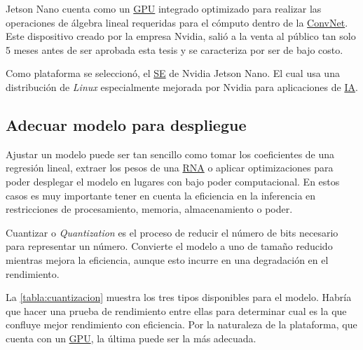 Jetson Nano cuenta como un \hyperlink{abbr}{GPU} integrado optimizado para
    realizar las operaciones de álgebra lineal requeridas para el cómputo dentro
    de la \hyperlink{abbr}{ConvNet}. Este dispositivo creado por la empresa
    Nvidia, salió a la venta al público tan solo 5 meses antes de ser aprobada
    esta tesis y se caracteriza por ser de bajo costo.~\cite{Long2019}

Como plataforma se seleccionó, el \hyperlink{abbr}{SE} de Nvidia Jetson Nano. El
cual usa una distribución de \emph{Linux} especialmente mejorada por Nvidia para
aplicaciones de \hyperlink{abbr}{IA}. 

\subsection{Adecuar modelo para despliegue}
Ajustar un modelo puede ser tan sencillo como tomar los coeficientes de una
regresión lineal, extraer los pesos de una \hyperlink{abbr}{RNA} o aplicar
optimizaciones para poder desplegar el modelo en lugares con bajo poder
computacional. En estos casos es muy importante tener en cuenta la eficiencia en
la inferencia en restricciones de procesamiento, memoria, almacenamiento o
poder.

Cuantizar o \emph{Quantization} es el proceso de reducir el número de bits
necesario para representar un número. Convierte el modelo a uno de tamaño
reducido mientras mejora la eficiencia, aunque esto incurre en una degradación
en el rendimiento. 

La \autoref{tabla:cuantizacion} muestra los tres tipos disponibles para el
modelo. Habría que hacer una prueba de rendimiento entre ellas para determinar
cual es la que confluye mejor rendimiento con eficiencia. Por la naturaleza de
la plataforma, que cuenta con un \hyperlink{abbr}{GPU}, la última puede ser la
más adecuada.

\begin{table}[H]
    \centering
    \caption{Tipos de cuantización para modelos de Deep Learning}\label{tabla:cuantizacion}
    \end{table}

